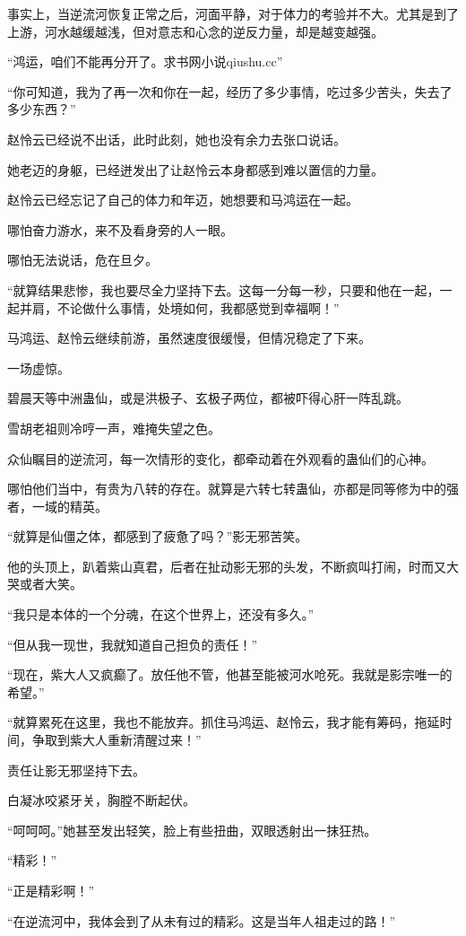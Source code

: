 \begin{this_body}
事实上，当逆流河恢复正常之后，河面平静，对于体力的考验并不大。尤其是到了上游，河水越缓越浅，但对意志和心念的逆反力量，却是越变越强。

“鸿运，咱们不能再分开了。求书网小说qiushu.cc”

“你可知道，我为了再一次和你在一起，经历了多少事情，吃过多少苦头，失去了多少东西？”

赵怜云已经说不出话，此时此刻，她也没有余力去张口说话。

她老迈的身躯，已经迸发出了让赵怜云本身都感到难以置信的力量。

赵怜云已经忘记了自己的体力和年迈，她想要和马鸿运在一起。

哪怕奋力游水，来不及看身旁的人一眼。

哪怕无法说话，危在旦夕。

“就算结果悲惨，我也要尽全力坚持下去。这每一分每一秒，只要和他在一起，一起并肩，不论做什么事情，处境如何，我都感觉到幸福啊！”

马鸿运、赵怜云继续前游，虽然速度很缓慢，但情况稳定了下来。

一场虚惊。

碧晨天等中洲蛊仙，或是洪极子、玄极子两位，都被吓得心肝一阵乱跳。

雪胡老祖则冷哼一声，难掩失望之色。

众仙瞩目的逆流河，每一次情形的变化，都牵动着在外观看的蛊仙们的心神。

哪怕他们当中，有贵为八转的存在。就算是六转七转蛊仙，亦都是同等修为中的强者，一域的精英。

“就算是仙僵之体，都感到了疲惫了吗？”影无邪苦笑。

他的头顶上，趴着紫山真君，后者在扯动影无邪的头发，不断疯叫打闹，时而又大哭或者大笑。

“我只是本体的一个分魂，在这个世界上，还没有多久。”

“但从我一现世，我就知道自己担负的责任！”

“现在，紫大人又疯癫了。放任他不管，他甚至能被河水呛死。我就是影宗唯一的希望。”

“就算累死在这里，我也不能放弃。抓住马鸿运、赵怜云，我才能有筹码，拖延时间，争取到紫大人重新清醒过来！”

责任让影无邪坚持下去。

白凝冰咬紧牙关，胸膛不断起伏。

“呵呵呵。”她甚至发出轻笑，脸上有些扭曲，双眼透射出一抹狂热。

“精彩！”

“正是精彩啊！”

“在逆流河中，我体会到了从未有过的精彩。这是当年人祖走过的路！”


\end{this_body}
